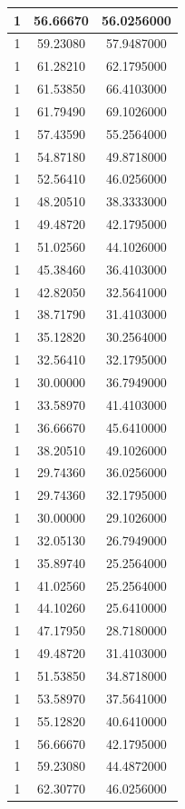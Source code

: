 \documentclass[
]{book}
\begin{document}
\begin{tabular}{c|c|c}
\hline
1 & 56.66670 & 56.0256000\\
\hline
1 & 59.23080 & 57.9487000\\
\hline
1 & 61.28210 & 62.1795000\\
\hline
1 & 61.53850 & 66.4103000\\
\hline
1 & 61.79490 & 69.1026000\\
\hline
1 & 57.43590 & 55.2564000\\
\hline
1 & 54.87180 & 49.8718000\\
\hline
1 & 52.56410 & 46.0256000\\
\hline
1 & 48.20510 & 38.3333000\\
\hline
1 & 49.48720 & 42.1795000\\
\hline
1 & 51.02560 & 44.1026000\\
\hline
1 & 45.38460 & 36.4103000\\
\hline
1 & 42.82050 & 32.5641000\\
\hline
1 & 38.71790 & 31.4103000\\
\hline
1 & 35.12820 & 30.2564000\\
\hline
1 & 32.56410 & 32.1795000\\
\hline
1 & 30.00000 & 36.7949000\\
\hline
1 & 33.58970 & 41.4103000\\
\hline
1 & 36.66670 & 45.6410000\\
\hline
1 & 38.20510 & 49.1026000\\
\hline
1 & 29.74360 & 36.0256000\\
\hline
1 & 29.74360 & 32.1795000\\
\hline
1 & 30.00000 & 29.1026000\\
\hline
1 & 32.05130 & 26.7949000\\
\hline
1 & 35.89740 & 25.2564000\\
\hline
1 & 41.02560 & 25.2564000\\
\hline
1 & 44.10260 & 25.6410000\\
\hline
1 & 47.17950 & 28.7180000\\
\hline
1 & 49.48720 & 31.4103000\\
\hline
1 & 51.53850 & 34.8718000\\
\hline
1 & 53.58970 & 37.5641000\\
\hline
1 & 55.12820 & 40.6410000\\
\hline
1 & 56.66670 & 42.1795000\\
\hline
1 & 59.23080 & 44.4872000\\
\hline
1 & 62.30770 & 46.0256000\\

\end{tabular}
\end{document}
